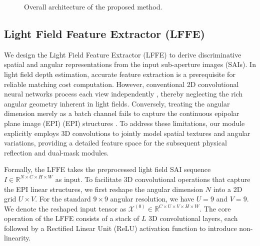 \documentclass[lettersize,journal]{IEEEtran}
\begin{document}
\begin{figure}[!t]
\caption{Overall architecture of the proposed method.}
\label{fig:architecture}
\end{figure}

\subsection{Light Field Feature Extractor (LFFE)}

We design the Light Field Feature Extractor (LFFE) to derive discriminative spatial and angular representations from the input sub-aperture images (SAIs). In light field depth estimation, accurate feature extraction is a prerequisite for reliable matching cost computation. However, conventional 2D convolutional neural networks process each view independently , thereby neglecting the rich angular geometry inherent in light fields. Conversely, treating the angular dimension merely as a batch channel fails to capture the continuous epipolar plane image (EPI) (EPI) structures . To address these limitations, our module explicitly employs 3D convolutions to jointly model spatial textures and angular variations, providing a detailed feature space for the subsequent physical reflection and dual-mask modules.

Formally, the LFFE takes the preprocessed light field SAI sequence $I \in \mathbb{R}^{N \times C \times H \times W}$ as input. To facilitate 3D convolutional operations that capture the EPI linear structures, we first reshape the angular dimension $N$ into a 2D grid $U \times V$. For the standard $9 \times 9$ angular resolution, we have $U=9$ and $V=9$. We denote the reshaped input tensor as $\mathcal{X}^{(0)} \in \mathbb{R}^{C \times U \times V \times H \times W}$. The core operation of the LFFE consists of a stack of $L$ 3D convolutional layers, each followed by a Rectified Linear Unit (ReLU) activation function to introduce non-linearity. 
\end{document}
